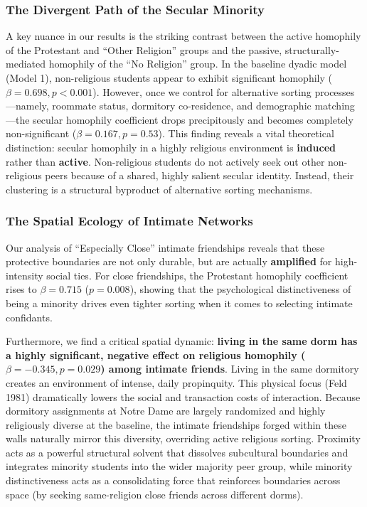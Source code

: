 \documentclass[
  letterpaper,
  DIV=11,
  numbers=noendperiod]{scrartcl}
\begin{document}
\subsubsection{The Divergent Path of the Secular
Minority}\label{the-divergent-path-of-the-secular-minority}

A key nuance in our results is the striking contrast between the active
homophily of the Protestant and ``Other Religion'' groups and the
passive, structurally-mediated homophily of the ``No Religion'' group.
In the baseline dyadic model (Model 1), non-religious students appear to
exhibit significant homophily (\(\beta = 0.698, p < 0.001\)). However,
once we control for alternative sorting processes---namely, roommate
status, dormitory co-residence, and demographic matching---the secular
homophily coefficient drops precipitously and becomes completely
non-significant (\(\beta = 0.167, p = 0.53\)). This finding reveals a
vital theoretical distinction: secular homophily in a highly religious
environment is \textbf{induced} rather than \textbf{active}.
Non-religious students do not actively seek out other non-religious
peers because of a shared, highly salient secular identity. Instead,
their clustering is a structural byproduct of alternative sorting
mechanisms.

\subsubsection{The Spatial Ecology of Intimate
Networks}\label{the-spatial-ecology-of-intimate-networks}

Our analysis of ``Especially Close'' intimate friendships reveals that
these protective boundaries are not only durable, but are actually
\textbf{amplified} for high-intensity social ties. For close
friendships, the Protestant homophily coefficient rises to
\(\beta = 0.715\) (\(p = 0.008\)), showing that the psychological
distinctiveness of being a minority drives even tighter sorting when it
comes to selecting intimate confidants.

Furthermore, we find a critical spatial dynamic: \textbf{living in the
same dorm has a highly significant, negative effect on religious
homophily (\(\beta = -0.345, p = 0.029\)) among intimate friends}.
Living in the same dormitory creates an environment of intense, daily
propinquity. This physical focus (Feld 1981) dramatically lowers the
social and transaction costs of interaction. Because dormitory
assignments at Notre Dame are largely randomized and highly religiously
diverse at the baseline, the intimate friendships forged within these
walls naturally mirror this diversity, overriding active religious
sorting. Proximity acts as a powerful structural solvent that dissolves
subcultural boundaries and integrates minority students into the wider
majority peer group, while minority distinctiveness acts as a
consolidating force that reinforces boundaries across space (by seeking
same-religion close friends across different dorms).
\end{document}
